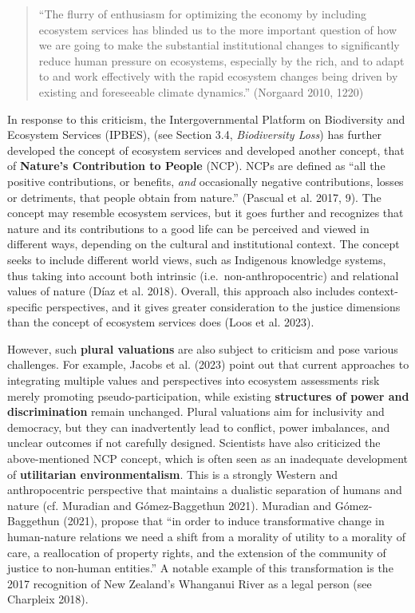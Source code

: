 \documentclass[
  a4paper,
  DIV=11,
  numbers=noendperiod,
  oneside,
  openany]{scrreprt}
\begin{document}
\begin{quote}
``The flurry of enthusiasm for optimizing the economy by including
ecosystem services has blinded us to the more important question of how
we are going to make the substantial institutional changes to
significantly reduce human pressure on ecosystems, especially by the
rich, and to adapt to and work effectively with the rapid ecosystem
changes being driven by existing and foreseeable climate dynamics.''
(Norgaard 2010, 1220)
\end{quote}

In response to this criticism, the Intergovernmental Platform on
Biodiversity and Ecosystem Services (IPBES), (see Section 3.4,
\emph{Biodiversity Loss}) has further developed the concept of ecosystem
services and developed another concept, that of \textbf{Nature's
Contribution to People} (NCP). NCPs are defined as ``all the positive
contributions, or benefits, \emph{and} occasionally negative
contributions, losses or detriments, that people obtain from nature.''
({Pascual et al.} 2017, 9). The concept may resemble ecosystem services,
but it goes further and recognizes that nature and its contributions to
a good life can be perceived and viewed in different ways, depending on
the cultural and institutional context. The concept seeks to include
different world views, such as Indigenous knowledge systems, thus taking
into account both intrinsic (i.e.~non-anthropocentric) and relational
values of nature ({Díaz et al.} 2018). Overall, this approach also
includes context-specific perspectives, and it gives greater
consideration to the justice dimensions than the concept of ecosystem
services does (Loos et al. 2023).

However, such \textbf{plural valuations} are also subject to criticism
and pose various challenges. For example, Jacobs et al. (2023) point out
that current approaches to integrating multiple values and perspectives
into ecosystem assessments risk merely promoting pseudo-participation,
while existing \textbf{structures of power and discrimination} remain
unchanged. Plural valuations aim for inclusivity and democracy, but they
can inadvertently lead to conflict, power imbalances, and unclear
outcomes if not carefully designed. Scientists have also criticized the
above-mentioned NCP concept, which is often seen as an inadequate
development of \textbf{utilitarian environmentalism}. This is a strongly
Western and anthropocentric perspective that maintains a dualistic
separation of humans and nature (cf. Muradian and Gómez-Baggethun 2021).
Muradian and Gómez-Baggethun (2021), propose that ``in order to induce
transformative change in human-nature relations we need a shift from a
morality of utility to a morality of care, a reallocation of property
rights, and the extension of the community of justice to non-human
entities.'' A notable example of this transformation is the 2017
recognition of New Zealand's Whanganui River as a legal person (see
Charpleix 2018).
\end{document}

